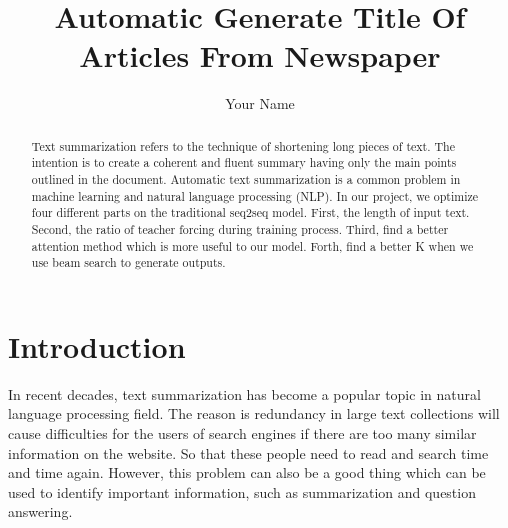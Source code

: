 \documentclass[sigconf]{acmart}
\begin{document}
\Large
%

\title{Automatic Generate Title Of Articles From Newspaper}

%
\author{Your Name}






%
\begin{abstract}
Text summarization refers to the technique of shortening long pieces of text. The intention is to create a coherent and fluent summary having only the main points outlined in the document. Automatic text summarization is a common problem in machine learning and natural language processing (NLP). In our project, we optimize four different parts on the traditional seq2seq model. First, the length of input text. Second, the ratio of teacher forcing during training process. Third, find a better attention method which is more useful to our model. Forth, find a better K when we use beam search to generate outputs. 
\end{abstract}
\maketitle


\section{Introduction}
In recent decades, text summarization has become a popular topic in natural language processing field. The reason is redundancy in large text collections will cause difficulties for the users of search engines if there are too many similar information on the website. So that these people need to read and search time and time again. However, this problem can also be a good thing which can be used to identify important information, such as summarization and question answering.
\end{document}
